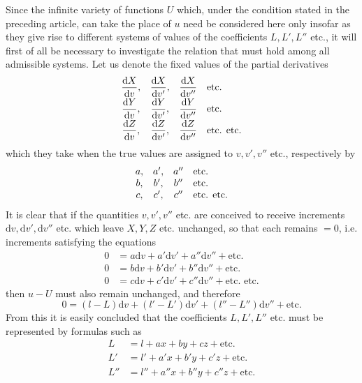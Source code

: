 Since the infinite variety of functions \(U\) which, under the condition stated in the preceding article, can take the place of \(u\) need be considered here only insofar as they give rise to different systems of values of the coefficients \(L,L',L''\) etc., it will first of all be necessary to investigate the relation that must hold among all admissible systems. Let us denote the fixed values of the partial derivatives
\begingroup\renewcommand{\arraystretch}{2}
\[
\begin{array}{ccc l}
\dfrac{\mathrm dX}{\mathrm dv},&\dfrac{\mathrm dX}{\mathrm dv'},&\dfrac{\mathrm dX}{\mathrm dv''}&\text{etc.}\\[5pt]
\dfrac{\mathrm dY}{\mathrm dv},&\dfrac{\mathrm dY}{\mathrm dv'},&\dfrac{\mathrm dY}{\mathrm dv''}&\text{etc.}\\[5pt]
\dfrac{\mathrm dZ}{\mathrm dv},&\dfrac{\mathrm dZ}{\mathrm dv'},&\dfrac{\mathrm dZ}{\mathrm dv''}&\text{etc. etc.}
\end{array}
\]
\endgroup
which they take when the true values are assigned to \(v,v',v''\) etc., respectively by
\[
\begin{array}{ccc l}
a,&a',&a''&\text{etc.}\\
b,&b',&b''&\text{etc.}\\
c,&c',&c''&\text{etc. etc.}
\end{array}
\]
It is clear that if the quantities \(v,v',v''\) etc. are conceived to receive increments \(\mathrm dv,\mathrm dv',\mathrm dv''\) etc. which leave \(X,Y,Z\) etc. unchanged, so that each remains \(=0\), i.e. increments satisfying the equations
\[
\begin{aligned}
0&=a\mathrm dv+a'\mathrm dv'+a''\mathrm dv''+\text{etc.}\\
0&=b\mathrm dv+b'\mathrm dv'+b''\mathrm dv''+\text{etc.}\\
0&=c\mathrm dv+c'\mathrm dv'+c''\mathrm dv''+\text{etc. etc.}
\end{aligned}
\]
then \(u-U\) must also remain unchanged, and therefore
\[
0=(l-L)\mathrm dv+(l'-L')\mathrm dv'+(l''-L'')\mathrm dv''+\text{etc.}
\]
%
From this it is easily concluded that the coefficients \(L,L',L''\) etc. must be represented by formulas such as
\[
\begin{aligned}
L&=l+ax+by+cz+\text{etc.}\\
L'&=l'+a'x+b'y+c'z+\text{etc.}\\
L''&=l''+a''x+b''y+c''z+\text{etc.}
\end{aligned}
\]
